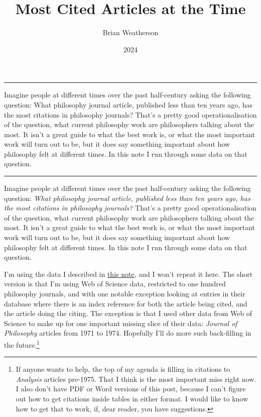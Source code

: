 \documentclass[
  10pt,
  letterpaper,
  DIV=11,
  numbers=noendperiod,
  twoside]{scrartcl}
\title{Most Cited Articles at the Time}
\author{Brian Weatherson}
\date{2024}
\renewenvironment{abstract}
 {\vspace{-1.25cm}
 \quotation\small\noindent\rule{\linewidth}{.5pt}\par\smallskip
 \noindent }
 {\par\noindent\rule{\linewidth}{.5pt}\endquotation}
\begin{document}
\maketitle
\begin{abstract}
Imagine people at different times over the past half-century asking the
following question: What philosophy journal article, published less than
ten years ago, has the most citations in philosophy journals? That's a
pretty good operationalisation of the question, what current philosophy
work are philosophers talking about the most. It isn't a great guide to
what the best work is, or what the most important work will turn out to
be, but it does say something important about how philosophy felt at
different times. In this note I run through some data on that question.
\end{abstract}


Imagine people at different times over the past half-century asking the
following question: \emph{What philosophy journal article, published
less than ten years ago, has the most citations in philosophy journals?}
That's a pretty good operationalisation of the question, what current
philosophy work are philosophers talking about the most. It isn't a
great guide to what the best work is, or what the most important work
will turn out to be, but it does say something important about how
philosophy felt at different times. In this note I run through some data
on that question.

I'm using the data I described in
\href{https://brian.weatherson.org/quarto/posts/citations/raw-data/citations.html}{this
note}, and I won't repeat it here. The short version is that I'm using
Web of Science data, restricted to one hundred philosophy journals, and
with one notable exception looking at entries in their database where
there is an index reference for both the article being cited, and the
article doing the citing. The exception is that I used other data from
Web of Science to make up for one important missing slice of their data:
\emph{Journal of Philosophy} articles from 1971 to 1974. Hopefully I'll
do more such back-filling in the future.\footnote{If anyone wants to
  help, the top of my agenda is filling in citations to \emph{Analysis}
  articles pre-1975. That I think is the most important miss right now.
  I also don't have PDF or Word versions of this post, because I can't
  figure out how to get citations inside tables in either format. I
  would like to know how to get that to work, if, dear reader, you have
  suggestions.}
\end{document}

